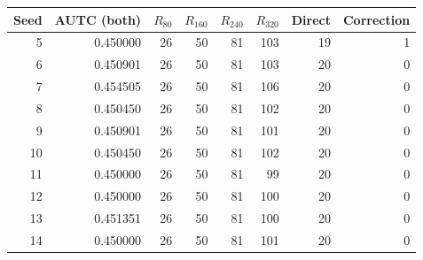 \begin{tabular}{rrrrrrrr}
\toprule
Seed & AUTC (both) & $R_{80}$ & $R_{160}$ & $R_{240}$ & $R_{320}$ & Direct & Correction \\
\midrule
5 & 0.450000 & 26 & 50 & 81 & 103 & 19 & 1 \\
6 & 0.450901 & 26 & 50 & 81 & 103 & 20 & 0 \\
7 & 0.454505 & 26 & 50 & 81 & 106 & 20 & 0 \\
8 & 0.450450 & 26 & 50 & 81 & 102 & 20 & 0 \\
9 & 0.450901 & 26 & 50 & 81 & 101 & 20 & 0 \\
10 & 0.450450 & 26 & 50 & 81 & 102 & 20 & 0 \\
11 & 0.450000 & 26 & 50 & 81 & 99 & 20 & 0 \\
12 & 0.450000 & 26 & 50 & 81 & 100 & 20 & 0 \\
13 & 0.451351 & 26 & 50 & 81 & 100 & 20 & 0 \\
14 & 0.450000 & 26 & 50 & 81 & 101 & 20 & 0 \\
\bottomrule
\end{tabular}
